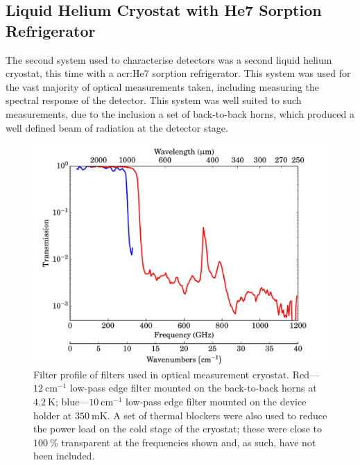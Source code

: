 \subsection{Liquid Helium Cryostat with He7 Sorption Refrigerator}
\label{ssec:CookieMonster}
The second system used to characterise detectors was a second liquid helium cryostat, this time with a \gls{acr:He7} sorption refrigerator. This system was used for the vast majority of optical measurements taken, including measuring the spectral response of the detector. This system was well suited to such measurements, due to the inclusion a set of back-to-back horns, which produced a well defined beam of radiation at the detector stage.
\begin{figure}[tb]
\begin{center}
\includegraphics[width = 1.0\textwidth]{figures/CookieMonsterFilters}
\caption[Filter profile of filters used in the optical measurement cryostat]{Filter profile of filters used in optical measurement cryostat. Red---$12~\mathrm{cm}^{-1}$ low-pass edge filter mounted on the back-to-back horns at $4.2~\mathrm{K}$; blue---$10~\mathrm{cm}^{-1}$ low-pass edge filter mounted on the device holder at $350~\mathrm{mK}$. A set of thermal blockers were also used to reduce the power load on the cold stage of the cryostat; these were close to $100~\%$ transparent at the frequencies shown and, as such, have not been included.}
\label{fig:CookieMonsterFilters}
\end{center}
\end{figure}
\par 
